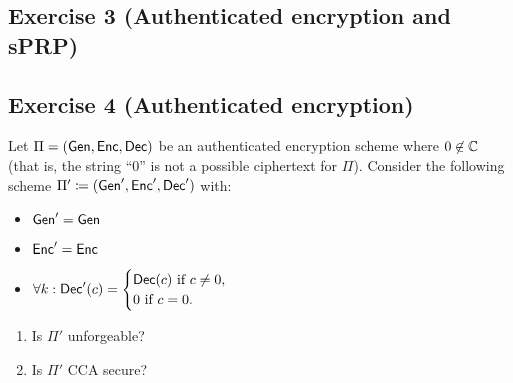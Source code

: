 \subsection{Exercise 3 (Authenticated encryption and sPRP)}




\subsection{Exercise 4 (Authenticated encryption)}

Let $\Pi=(\operatorname{\mathsf{Gen}}, \operatorname{\mathsf{Enc}}, \operatorname{\mathsf{Dec}})$ be an authenticated encryption scheme where $0\not\in \mathbb{C}$ (that is, the string ``0'' is not a possible ciphertext for $\Pi$). Consider the following scheme $\Pi' \coloneqq (\operatorname{\mathsf{Gen}}', \operatorname{\mathsf{Enc}}', \operatorname{\mathsf{Dec}}')$ with:
\begin{itemize}
	\item $\operatorname{\mathsf{Gen}}'=\operatorname{\mathsf{Gen}}$
	\item $\operatorname{\mathsf{Enc}}'=\operatorname{\mathsf{Enc}}$
	\item $\forall k: \operatorname{\mathsf{Dec}}'(c) = \begin{cases} \operatorname{\mathsf{Dec}}(c) \text{ if } c\neq 0, \\ 0 \text{ if } c=0. \end{cases}$
\end{itemize}
\begin{enumerate}
	\item Is $\Pi'$ unforgeable?
	\item Is $\Pi'$ CCA secure?
\end{enumerate}


